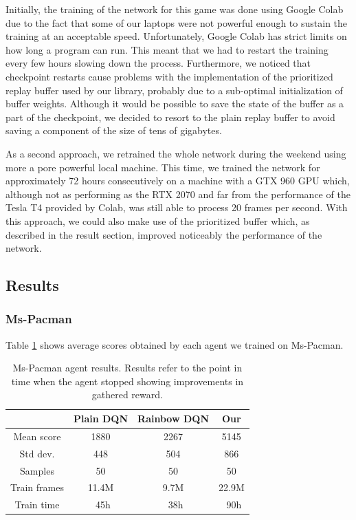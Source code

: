 \documentclass[10pt,twocolumn,letterpaper]{article}
\begin{document}
Initially, the training of the network for this game was done using Google Colab due to the fact that some of our laptops were not powerful enough to sustain the training at an acceptable speed. Unfortunately, Google Colab has strict limits on how long a program can run. This meant that we had to restart the training every few hours slowing down the process. Furthermore, we noticed that checkpoint restarts cause problems with the implementation of the prioritized replay buffer used by our library, probably due to a sub-optimal initialization of buffer weights. Although it would be possible to save the state of the buffer as a part of the checkpoint, we decided to resort to the plain replay buffer to avoid saving a component of the size of tens of gigabytes.

As a second approach, we retrained the whole network during the weekend using more a pore powerful local machine. This time, we trained the network for approximately 72 hours consecutively on a machine with a GTX 960 GPU which, although not as performing as the RTX 2070 and far from the performance of the Tesla T4 provided by Colab, was still able to process 20 frames per second. With this approach, we could also make use of the prioritized buffer which, as described in the result section, improved noticeably the performance of the network.

\subsection{Results}

\subsubsection{Ms-Pacman}

Table \ref{tab:pacman_results} shows average scores obtained by each agent we trained on Ms-Pacman.

\begin{table}
	\begin{center}
		\begin{tabular}{ |c|c|c|c| } 
			\hline
			 & Plain DQN & Rainbow DQN & Our \\ 
			 \hline
			Mean score & 1880 & 2267 & 5145 \\
			Std dev. & 448 & 504 & 866 \\
			Samples & 50 & 50 & 50 \\
			Train frames & 11.4M & 9.7M & 22.9M \\
			Train time & ~45h & ~38h & ~90h \\
			\hline
		\end{tabular}
	\end{center}
	\caption{Ms-Pacman agent results. Results refer to the point in time when the agent stopped showing improvements in gathered reward.}
	\label{tab:pacman_results}
\end{table}
\end{document}
